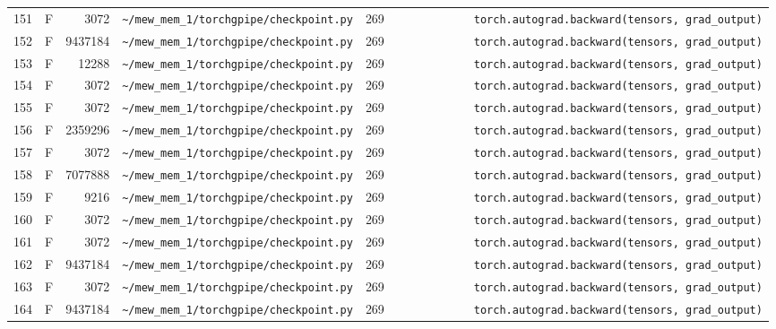 \documentclass{article}
\begin{document}
\begin{longtable}{r l r p{6.5cm} r p{7.0cm}}
151 & F & 3072 & \lstinline|~/mew_mem_1/torchgpipe/checkpoint.py| & 269 & \lstinline|            torch.autograd.backward(tensors, grad_output)| \\
152 & F & 9437184 & \lstinline|~/mew_mem_1/torchgpipe/checkpoint.py| & 269 & \lstinline|            torch.autograd.backward(tensors, grad_output)| \\
153 & F & 12288 & \lstinline|~/mew_mem_1/torchgpipe/checkpoint.py| & 269 & \lstinline|            torch.autograd.backward(tensors, grad_output)| \\
154 & F & 3072 & \lstinline|~/mew_mem_1/torchgpipe/checkpoint.py| & 269 & \lstinline|            torch.autograd.backward(tensors, grad_output)| \\
155 & F & 3072 & \lstinline|~/mew_mem_1/torchgpipe/checkpoint.py| & 269 & \lstinline|            torch.autograd.backward(tensors, grad_output)| \\
156 & F & 2359296 & \lstinline|~/mew_mem_1/torchgpipe/checkpoint.py| & 269 & \lstinline|            torch.autograd.backward(tensors, grad_output)| \\
157 & F & 3072 & \lstinline|~/mew_mem_1/torchgpipe/checkpoint.py| & 269 & \lstinline|            torch.autograd.backward(tensors, grad_output)| \\
158 & F & 7077888 & \lstinline|~/mew_mem_1/torchgpipe/checkpoint.py| & 269 & \lstinline|            torch.autograd.backward(tensors, grad_output)| \\
159 & F & 9216 & \lstinline|~/mew_mem_1/torchgpipe/checkpoint.py| & 269 & \lstinline|            torch.autograd.backward(tensors, grad_output)| \\
160 & F & 3072 & \lstinline|~/mew_mem_1/torchgpipe/checkpoint.py| & 269 & \lstinline|            torch.autograd.backward(tensors, grad_output)| \\
161 & F & 3072 & \lstinline|~/mew_mem_1/torchgpipe/checkpoint.py| & 269 & \lstinline|            torch.autograd.backward(tensors, grad_output)| \\
162 & F & 9437184 & \lstinline|~/mew_mem_1/torchgpipe/checkpoint.py| & 269 & \lstinline|            torch.autograd.backward(tensors, grad_output)| \\
163 & F & 3072 & \lstinline|~/mew_mem_1/torchgpipe/checkpoint.py| & 269 & \lstinline|            torch.autograd.backward(tensors, grad_output)| \\
164 & F & 9437184 & \lstinline|~/mew_mem_1/torchgpipe/checkpoint.py| & 269 & \lstinline|            torch.autograd.backward(tensors, grad_output)| \\

\end{longtable}
\end{document}
